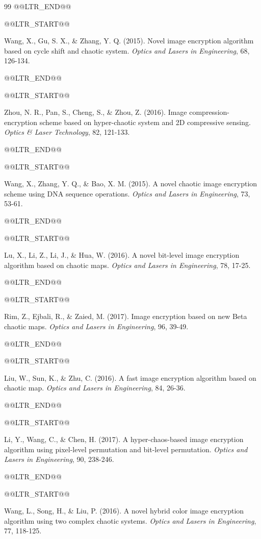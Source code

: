 \begin{thebibliography}{99}
@@LTR_END@@

@@LTR_START@@

 Wang, X., Gu, S. X., \& Zhang, Y. Q. (2015). Novel image encryption algorithm based on cycle shift and chaotic system. \textit{Optics and Lasers in Engineering}, 68, 126-134.

@@LTR_END@@

@@LTR_START@@

 Zhou, N. R., Pan, S., Cheng, S., \& Zhou, Z. (2016). Image compression-encryption scheme based on hyper-chaotic system and 2D compressive sensing. \textit{Optics \& Laser Technology}, 82, 121-133.

@@LTR_END@@

@@LTR_START@@

 Wang, X., Zhang, Y. Q., \& Bao, X. M. (2015). A novel chaotic image encryption scheme using DNA sequence operations. \textit{Optics and Lasers in Engineering}, 73, 53-61.

@@LTR_END@@

@@LTR_START@@

 Lu, X., Li, Z., Li, J., \& Hua, W. (2016). A novel bit-level image encryption algorithm based on chaotic maps. \textit{Optics and Lasers in Engineering}, 78, 17-25.

@@LTR_END@@

@@LTR_START@@

 Rim, Z., Ejbali, R., \& Zaied, M. (2017). Image encryption based on new Beta chaotic maps. \textit{Optics and Lasers in Engineering}, 96, 39-49.

@@LTR_END@@

@@LTR_START@@

 Liu, W., Sun, K., & Zhu, C. (2016). A fast image encryption algorithm based on chaotic map. \textit{Optics and Lasers in Engineering}, 84, 26-36.

@@LTR_END@@

@@LTR_START@@

 Li, Y., Wang, C., \& Chen, H. (2017). A hyper-chaos-based image encryption algorithm using pixel-level permutation and bit-level permutation. \textit{Optics and Lasers in Engineering}, 90, 238-246.

@@LTR_END@@

@@LTR_START@@

 Wang, L., Song, H., \& Liu, P. (2016). A novel hybrid color image encryption algorithm using two complex chaotic systems. \textit{Optics and Lasers in Engineering}, 77, 118-125.


\end{thebibliography}
